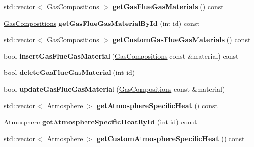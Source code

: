 \begin{DoxyCompactItemize}
\item 
\mbox{\label{class_s_q_lite_a7f054c9a3a3954277c5de8d4048a40f9}} 
std\+::vector$<$ \hyperlink{class_gas_compositions}{Gas\+Compositions} $>$ {\bfseries get\+Gas\+Flue\+Gas\+Materials} () const
\item 
\mbox{\label{class_s_q_lite_a230049a94b9e2ff84d19fcd5a087954c}} 
\hyperlink{class_gas_compositions}{Gas\+Compositions} {\bfseries get\+Gas\+Flue\+Gas\+Material\+By\+Id} (int id) const
\item 
\mbox{\label{class_s_q_lite_a8cd9d62714f1083bab16e388dabc59be}} 
std\+::vector$<$ \hyperlink{class_gas_compositions}{Gas\+Compositions} $>$ {\bfseries get\+Custom\+Gas\+Flue\+Gas\+Materials} () const
\item 
\mbox{\label{class_s_q_lite_a95d5521ed0de19c979ac9627ae21fbcd}} 
bool {\bfseries insert\+Gas\+Flue\+Gas\+Material} (\hyperlink{class_gas_compositions}{Gas\+Compositions} const \&material) const
\item 
\mbox{\label{class_s_q_lite_a12b38db00e6d8bcff8345e7300a67b26}} 
bool {\bfseries delete\+Gas\+Flue\+Gas\+Material} (int id)
\item 
\mbox{\label{class_s_q_lite_a71c1973e285ccae25b7bb8dbc101770e}} 
bool {\bfseries update\+Gas\+Flue\+Gas\+Material} (\hyperlink{class_gas_compositions}{Gas\+Compositions} const \&material)
\item 
\mbox{\label{class_s_q_lite_a04d22b056b51fb07d192833806eabdfc}} 
std\+::vector$<$ \hyperlink{class_atmosphere}{Atmosphere} $>$ {\bfseries get\+Atmosphere\+Specific\+Heat} () const
\item 
\mbox{\label{class_s_q_lite_ae468835cffed182bb9819299463c53b7}} 
\hyperlink{class_atmosphere}{Atmosphere} {\bfseries get\+Atmosphere\+Specific\+Heat\+By\+Id} (int id) const
\item 
\mbox{\label{class_s_q_lite_adecfb81514a3fa09237baa50b2edf5e7}} 
std\+::vector$<$ \hyperlink{class_atmosphere}{Atmosphere} $>$ {\bfseries get\+Custom\+Atmosphere\+Specific\+Heat} () const

\end{DoxyCompactItemize}
